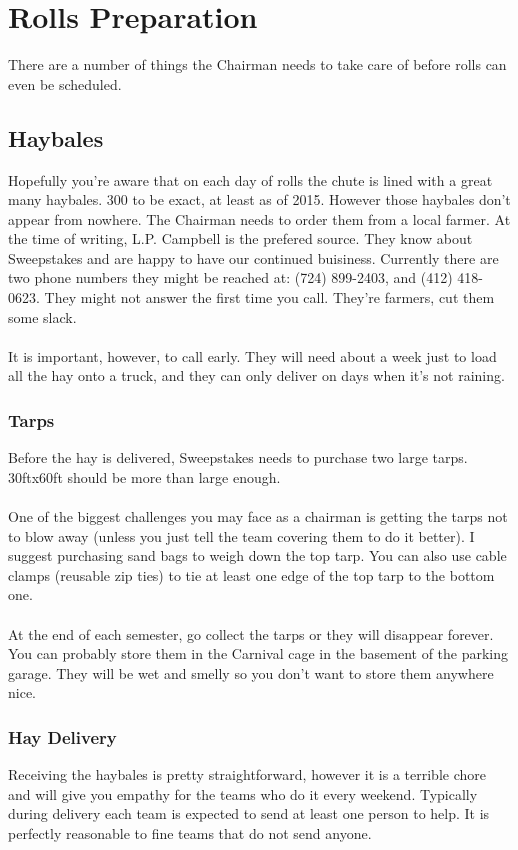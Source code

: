 \section{Rolls Preparation}
\label{sec:ChairRollsPrep}
There are a number of things the Chairman needs to take care of before rolls
can even be scheduled.

\subsection{Haybales}
Hopefully you're aware that on each day of rolls the chute is lined with a
great many haybales. 300 to be exact, at least as of 2015. However
those haybales don't appear from nowhere. The Chairman needs to order them
from a local farmer. At the time of writing, L.P. Campbell is the prefered
source. They know about Sweepstakes and are happy to have our continued
buisiness. Currently there are two phone numbers they might be reached at:
(724) 899-2403, and (412) 418-0623. They might not answer the first time you
call. They're farmers, cut them some slack.
\\\\
It is important, however, to call early. They will need about a week just
to load all the hay onto a truck, and they can only deliver on days when
it's not raining.

\subsubsection{Tarps}
Before the hay is delivered, Sweepstakes needs to purchase two large tarps.
30ftx60ft should be more than large enough.
\\\\
One of the biggest challenges you may face as a chairman is getting the tarps
not to blow away (unless you just tell the team covering them to do it better).
I suggest purchasing sand bags to weigh down the top tarp. You can also use
cable clamps (reusable zip ties) to tie at least one edge of the top tarp
to the bottom one.
\\\\
At the end of each semester, go collect the tarps or they will disappear
forever. You can probably store them in the Carnival cage in the basement of
the parking garage. They will be wet and smelly so you don't want to store
them anywhere nice.

\subsubsection{Hay Delivery}
Receiving the haybales is pretty straightforward, however it is a terrible
chore and will give you empathy for the teams who do it every weekend.
Typically during delivery each team is expected to send at least one person to
help. It is perfectly reasonable to fine teams that do not send anyone.

